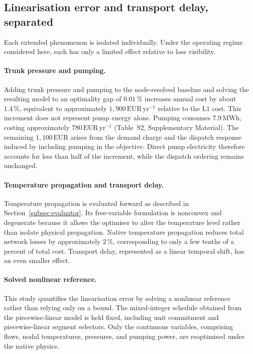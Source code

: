 \documentclass[a4paper,fleqn]{cas-sc}
\newcommand{\Lone}{\ensuremath{\mathrm{L1}}}    %
\begin{document}
\subsection{Linearisation error and transport delay, separated}
\label{subsec:linearisation}

Each extended phenomenon is isolated individually. Under the operating regime
considered here, each has only a limited effect relative to loss visibility.

\paragraph{Trunk pressure and pumping.}
Adding trunk pressure and pumping to the node-resolved baseline and solving the
resulting model to an optimality gap of \(0.01\,\%\) increases annual cost by about
\(1.4\,\%\), equivalent to approximately
\(1{,}900\,\mathrm{EUR}\,\mathrm{yr}^{-1}\) relative to the \(\Lone\) cost.
This increment does not represent pump energy alone. Pumping consumes
\(7.9\,\mathrm{MWh}\), costing approximately
\(780\,\mathrm{EUR}\,\mathrm{yr}^{-1}\) (Table~S2, Supplementary Material).
The remaining \(1{,}100\,\mathrm{EUR}\) arises from the demand charge and the
dispatch response induced by including pumping in the objective. Direct pump
electricity therefore accounts for less than half of the increment, while the
dispatch ordering remains unchanged.

\paragraph{Temperature propagation and transport delay.}
Temperature propagation is evaluated forward as described in
Section~\ref{subsec:evaluator}. Its free-variable formulation is nonconvex and
degenerate because it allows the optimiser to alter the temperature level rather
than isolate physical propagation. Native temperature propagation reduces total
network losses by approximately \(2\,\%\), corresponding to only a few tenths of
a percent of total cost. Transport delay, represented as a linear temporal shift,
has an even smaller effect.

\paragraph{Solved nonlinear reference.}
This study quantifies the linearisation error by solving a nonlinear reference
rather than relying only on a bound. The mixed-integer schedule obtained from the
piecewise-linear model is held fixed, including unit commitment and
piecewise-linear segment selectors. Only the continuous variables, comprising
flows, nodal temperatures, pressures, and pumping power, are reoptimised under
the native physics.
\end{document}

